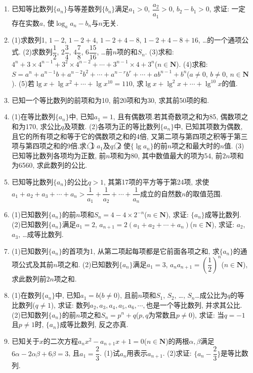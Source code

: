 \documentclass[10pt,a4paper]{article}
\begin{document}
\begin{enumerate}[1.]
\item 已知等比数列$\{a_n\}$与等差数列$\{b_n\}$满足$a_1>0$, $\dfrac{a_2}{a_1}>0$, $b_2-b_1>0$, 求证: 一定存在实数$a$, 使$\log _aa_n-b_n$与$n$无关.
\item (1)求数列1, $1-2$, $1-2+4$, $1-2+4-8$, $1-2+4-8+16$, …的一个通项公式.
(2)求数列$\dfrac 12$, $2\dfrac 34$, $4\dfrac 78$, $6\dfrac{15}{16}$, …前$n$项的和$S_n$.
(3)求和: $4^n+3\times 4^{n-1}+3^2\times 4^{n-2}+\cdots +3^{n-1}\times 4+3^n$($n\in \mathbf{N}$).
(4)求和: $S=a^n+a^{n-1}b+a^{n-2}b^2+\cdots +a^{n-r}b^r+\cdots +ab^{n-1}+b^n$($a\ne 0$, $b\ne 0$, $n\in \mathbf{N}$).
(5)若$\lg x+\lg x^2+\cdots +\lg x^{10}=110$, 求$\lg x+\lg ^2x+\cdots +\lg ^{10}x$的值.
\item 已知一个等比数列的前项和为10, 前20项和为30, 求其前50项的和.
\item (1)在等比数列$\{a_n\}$中, 已知$a_1=1$, 且有偶数项.若其奇数项之和为85, 偶数项之和为170, 求公比$q$及项数.
(2)各项为正的等比数列$\{a_n\}$中, 已知其项数为偶数, 且它的所有项之和等于它的偶数项之和的4倍, 又第二项与第四项之积等于第三项与第四项之和的9倍.求:
\textcircled{1} $a_1$及$q$; \textcircled{2} 使$\{\lg a_n\}$的前$n$项之和最大时的$n$值.
(3)已知等比数列各项均为正数, 前$n$项和为80, 其中数值最大的项为54, 前$2n$项和为6560, 求此数列的公比.
\item 已知等比数列$\{a_n\}$的公比$q>1$, 其第17项的平方等于第24项, 求使$a_1+a_2+a_3+\cdots +a_n>\dfrac 1{a_1}+\dfrac 1{a_2}+\cdots +\dfrac 1{a_n}$成立的自然数$n$的取值范围.
\item (1)已知数列$\{a_n\}$的前$n$项和$S_n=4-4\times 2^{-n}$($n\in \mathbf{N}$), 求证: $\{a_n\}$成等比数列.
(2)已知数列$\{a_n\}$满足$a_1=2$, $a_{n+1}=2(a_1+a_2+\cdots +a_n)$($n\in \mathbf{N}$), 求证: $a_2$, $a_3$, …成等比数列.
\item (1)已知数列$\{a_n\}$的首项为1, 从第二项起每项都是它前面各项之和, 求$\{a_n\}$的通项公式及其前$n$项之和.
(2)已知数列$\{a_n\}$满足$a_1=3$, $a_na_{n+1}=(\dfrac 12)^n$($n\in \mathbf{N}$), 求此数列前$2n$项之和.
\item (1)在数列$\{a_n\}$中, 已知$a_1=b$($b\ne 0$), 且前$n$项和$S_1$, $S_2$, …, $S_n$…成公比为$q$的等比数列($q\ne 1$), 求证: 数列$a_2,a_3,a_4,a_5,a_6,\cdots ,$也是一个等比数列, 并求其公比.
(2)已知数列$\{a_n\}$的前$n$项之和$S_n=p^n+q$($p,q$为常数且$p\ne 0$), 求证: 当$q=-1$且$p\ne 1$时, $\{a_n\}$成等比数列, 反之亦真.
\item 已知关于$x$的二次方程$a_nx^2-a_{n+1}x+1=0$($n\in \mathbf{N}$)的两根$\alpha ,\beta$满足$6\alpha -2\alpha \beta +6\beta =3$, 且$a_1=\dfrac 23$.
(1)试$a_n$用表示$a_{n+1}$.
(2)求证: $\{a_n-\dfrac 23\}$是等比数列.

\end{enumerate}
\end{document}
